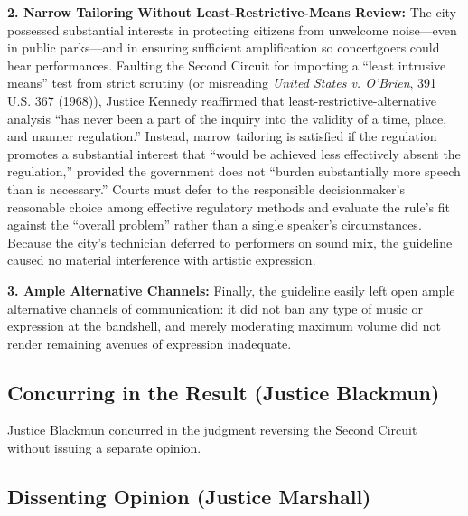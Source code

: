 \documentclass[12pt]{article}
\begin{document}
\textbf{2. Narrow Tailoring Without Least-Restrictive-Means Review:} The city possessed substantial interests in protecting citizens from unwelcome noise---even in public parks---and in ensuring sufficient amplification so concertgoers could hear performances. Faulting the Second Circuit for importing a ``least intrusive means'' test from strict scrutiny (or misreading \textit{United States v. O'Brien}, 391 U.S. 367 (1968)), Justice Kennedy reaffirmed that least-restrictive-alternative analysis ``has never been a part of the inquiry into the validity of a time, place, and manner regulation.'' Instead, narrow tailoring is satisfied if the regulation promotes a substantial interest that ``would be achieved less effectively absent the regulation,'' provided the government does not ``burden substantially more speech than is necessary.'' Courts must defer to the responsible decisionmaker's reasonable choice among effective regulatory methods and evaluate the rule's fit against the ``overall problem'' rather than a single speaker's circumstances. Because the city's technician deferred to performers on sound mix, the guideline caused no material interference with artistic expression.

\textbf{3. Ample Alternative Channels:} Finally, the guideline easily left open ample alternative channels of communication: it did not ban any type of music or expression at the bandshell, and merely moderating maximum volume did not render remaining avenues of expression inadequate.

\subsection{Concurring in the Result (Justice Blackmun)}

Justice Blackmun concurred in the judgment reversing the Second Circuit without issuing a separate opinion.

\subsection{Dissenting Opinion (Justice Marshall)}
\end{document}

